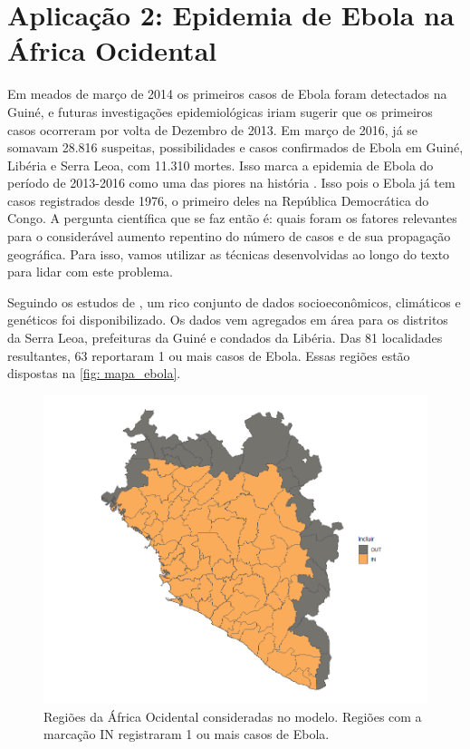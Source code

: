 \chapter{Aplicação 2: Epidemia de Ebola na África Ocidental}\label{chap:ebola}


Em meados de março de 2014 os primeiros casos de Ebola foram detectados na Guiné, e futuras investigações epidemiológicas iriam sugerir que os primeiros casos ocorreram por volta de Dezembro de 2013. Em março de 2016, já se somavam 28.816 suspeitas, possibilidades e casos confirmados de Ebola em Guiné, Libéria e Serra Leoa, com 11.310 mortes. Isso marca a epidemia de Ebola do período de 2013-2016 como uma das piores na história \cite{Carvalho2019}. Isso pois o Ebola já tem casos registrados desde 1976, o primeiro deles na República Democrática do Congo. A pergunta científica que se faz então é: quais foram os fatores relevantes para o considerável aumento repentino do número de casos e de sua propagação geográfica. Para isso, vamos utilizar as técnicas desenvolvidas ao longo do texto para lidar com este problema. 

Seguindo os estudos de \cite{Carvalho2019}, um rico conjunto de dados socioeconômicos, climáticos e genéticos foi disponibilizado. Os dados vem agregados em área para os distritos da Serra Leoa, prefeituras da Guiné e condados da Libéria. Das 81 localidades resultantes, 63 reportaram 1 ou mais casos de Ebola. Essas regiões estão dispostas na \autoref{fig: mapa_ebola}.

\begin{figure}[h]
    \centering
    \includegraphics[width = 0.8\linewidth]{images/ebola_regions.png}
    \caption{Regiões da África Ocidental consideradas no modelo. Regiões com a marcação IN registraram 1 ou mais casos de Ebola. }
    \label{fig: mapa_ebola}
\end{figure}

